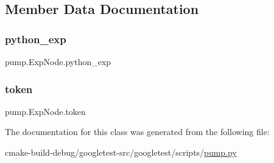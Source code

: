 \subsection{Member Data Documentation}
\mbox{\label{classpump_1_1ExpNode_adccfe4778c2e34f6b2c88118c0f1587f}} 
\subsubsection{\texorpdfstring{python\_exp}{python\_exp}}
{\footnotesize\ttfamily pump.\+Exp\+Node.\+python\+\_\+exp}

\mbox{\label{classpump_1_1ExpNode_ade05a5a32535d717dc5c194569aaf356}} 
\subsubsection{\texorpdfstring{token}{token}}
{\footnotesize\ttfamily pump.\+Exp\+Node.\+token}



The documentation for this class was generated from the following file\+:\begin{DoxyCompactItemize}
\item 
cmake-\/build-\/debug/googletest-\/src/googletest/scripts/\mbox{\hyperlink{pump_8py}{pump.\+py}}\end{DoxyCompactItemize}
